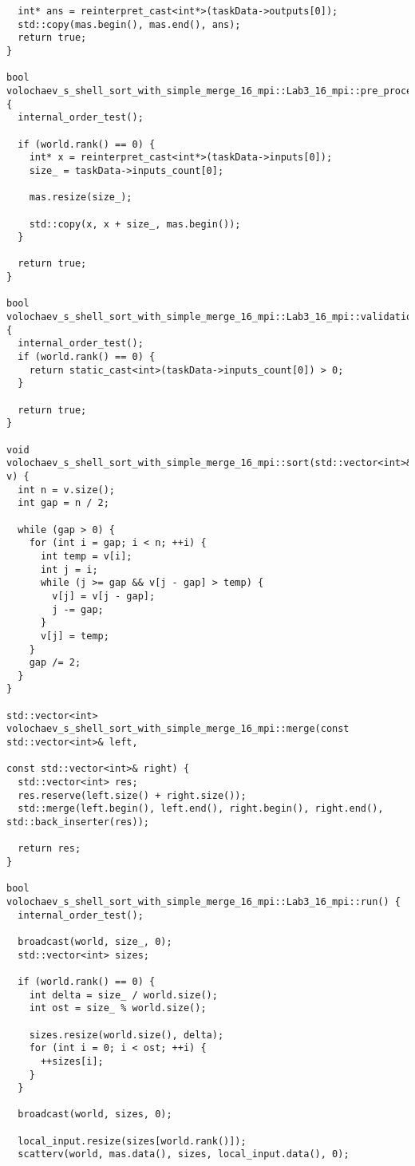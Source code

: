 \documentclass[12pt]{article}
\begin{document}
\begin{verbatim}
  int* ans = reinterpret_cast<int*>(taskData->outputs[0]);
  std::copy(mas.begin(), mas.end(), ans);
  return true;
}

bool volochaev_s_shell_sort_with_simple_merge_16_mpi::Lab3_16_mpi::pre_processing() {
  internal_order_test();

  if (world.rank() == 0) {
    int* x = reinterpret_cast<int*>(taskData->inputs[0]);
    size_ = taskData->inputs_count[0];

    mas.resize(size_);

    std::copy(x, x + size_, mas.begin());
  }

  return true;
}

bool volochaev_s_shell_sort_with_simple_merge_16_mpi::Lab3_16_mpi::validation() {
  internal_order_test();
  if (world.rank() == 0) {
    return static_cast<int>(taskData->inputs_count[0]) > 0;
  }

  return true;
}

void volochaev_s_shell_sort_with_simple_merge_16_mpi::sort(std::vector<int>& v) {
  int n = v.size();
  int gap = n / 2;

  while (gap > 0) {
    for (int i = gap; i < n; ++i) {
      int temp = v[i];
      int j = i;
      while (j >= gap && v[j - gap] > temp) {
        v[j] = v[j - gap];
        j -= gap;
      }
      v[j] = temp;
    }
    gap /= 2;
  }
}

std::vector<int> volochaev_s_shell_sort_with_simple_merge_16_mpi::merge(const std::vector<int>& left,
                                                                        const std::vector<int>& right) {
  std::vector<int> res;
  res.reserve(left.size() + right.size());
  std::merge(left.begin(), left.end(), right.begin(), right.end(), std::back_inserter(res));

  return res;
}

bool volochaev_s_shell_sort_with_simple_merge_16_mpi::Lab3_16_mpi::run() {
  internal_order_test();

  broadcast(world, size_, 0);
  std::vector<int> sizes;

  if (world.rank() == 0) {
    int delta = size_ / world.size();
    int ost = size_ % world.size();

    sizes.resize(world.size(), delta);
    for (int i = 0; i < ost; ++i) {
      ++sizes[i];
    }
  }

  broadcast(world, sizes, 0);

  local_input.resize(sizes[world.rank()]);
  scatterv(world, mas.data(), sizes, local_input.data(), 0);


\end{verbatim}
\end{document}
